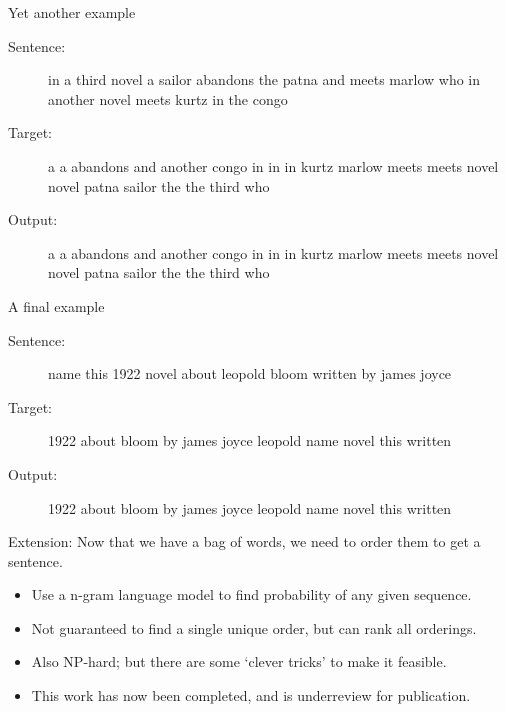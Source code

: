 \documentclass[]{beamer}
\begin{document}
\begin{frame}{Yet another example}
	\begin{description}
		\item[Sentence:] in a third novel a sailor abandons the patna and meets marlow who in another novel meets kurtz in the congo
		\item[Target:] a    a   abandons    and another congo   in  in  in  kurtz   marlow  meets   meets   novel   novel   patna   sailor  the the third   who
		\item[Output:] a    a   abandons    and another congo   in  in  in  kurtz   marlow  meets   meets   novel   novel   patna   sailor  the the third   who
	\end{description}
\end{frame}

\begin{frame}{A final example}
	\begin{description}
		\item[Sentence:] name this 1922 novel about leopold bloom written by james joyce
		\item[Target:] 1922 about   bloom   by  james   joyce   leopold name    novel   this    written
		\item[Output:] 1922 about   bloom   by  james   joyce   leopold name    novel   this    written
	\end{description}
\end{frame}





\begin{frame}{Extension: Now that we have a bag of words, we need to order them to get a sentence.}
	\begin{itemize}
		\item<1-> Use a n-gram language model to find probability of any given sequence.
		\item<2-> Not guaranteed to find a single unique order, but can rank all orderings.
		\item<3-> Also NP-hard; but there are some `clever tricks' to make it feasible.
		\item<4-> This work has now been completed, and is underreview for publication.
	\end{itemize}
\end{frame}
\end{document}
